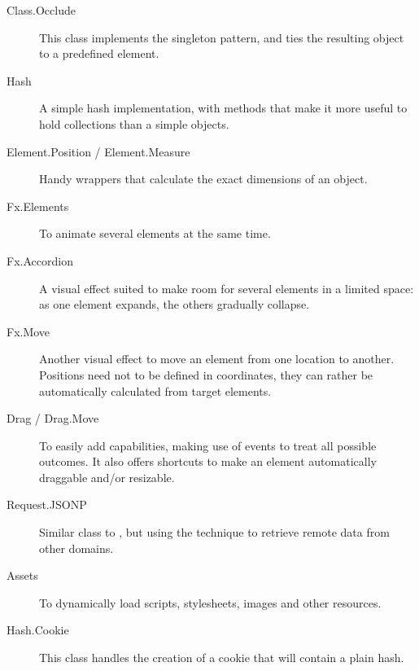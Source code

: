 \begin{description}
  \item[Class.Occlude] This class implements the singleton pattern, and ties the resulting object to a predefined  element.
  \item[Hash] A simple hash implementation, with methods that make it more useful to hold collections than a simple  objects.
  \item[Element.Position / Element.Measure] Handy wrappers that calculate the exact dimensions of an object.
  \item[Fx.Elements] To animate several elements at the same time.
  \item[Fx.Accordion] A visual effect suited to make room for several elements in a limited space: as one element expands, the others gradually collapse.
  \item[Fx.Move] Another visual effect to move an element from one location to another.
  Positions need not to be defined in coordinates, they can rather be automatically calculated from target elements.
  \item[Drag / Drag.Move] To easily add  capabilities, making use of events to treat all possible outcomes.
  It also offers shortcuts to make an element automatically draggable and/or resizable.
  \item[Request.JSONP] Similar class to , but using the  technique to retrieve remote data from other domains.
  \item[Assets] To dynamically load scripts, stylesheets, images and other resources.
  \item[Hash.Cookie] This class handles the creation of a cookie that will contain a plain hash.
\end{description}


